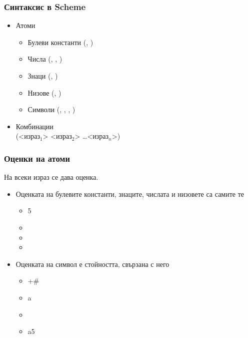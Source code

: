 \documentclass{beamer}
\begin{document}
\begin{frame}[fragile]
  \frametitle{Синтаксис в Scheme}

  \begin{itemize}
  \item Атоми
    \begin{itemize}
    \item Булеви константи (, )
    \item Числа (, , )
    \item Знаци (\lst{#\a}, \lst{#\newline})
    \item Низове (, )
    \item Символи (, , \lst{+}, )
    \end{itemize}
  \item Комбинации\\[1em]
    \alert({}<израз$_1$> <израз$_2$> \ldots <израз$_n$>\alert)
  \end{itemize}
\end{frame}

\begin{frame}[fragile]
  \frametitle{Оценки на атоми}

  На всеки израз се дава оценка.
  \begin{itemize}[<+->]
  \item Оценката на булевите константи, знаците, числата и низовете са самите те
    \begin{itemize}
    \item {} 5
    \item {}
    \item \evalsto{\#\\a}{\#\\a}
    \item {}
    \end{itemize}
  \item Оценката на символ е стойността, свързана с него
    \begin{itemize}
    \item \evalsto +{\#<procedure:+>}
    \item \evalstoerr a
    \item {}
    \item \evalsto a5
    \end{itemize}
  \end{itemize}
\end{frame}
\end{document}
